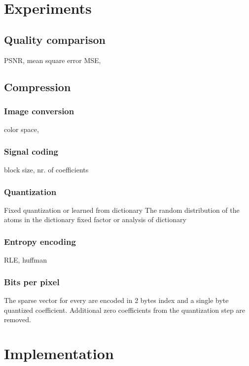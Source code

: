 \section{Experiments}
\subsection{Quality comparison}
PSNR, mean square error MSE, 



\subsection{Compression}
\subsubsection*{Image conversion}
color space, 
\subsubsection*{Signal coding}
block size, nr. of coefficients
\subsubsection*{Quantization}
Fixed quantization or learned from dictionary
The random distribution of the atoms in the dictionary 
fixed factor or analysis of dictionary
\subsubsection*{Entropy encoding}
RLE, huffman
\subsubsection*{Bits per pixel}
The sparse vector for every are encoded in 2 bytes index and a single byte quantized coefficient. Additional zero coefficients from the quantization step are removed.





\section{Implementation}
%

